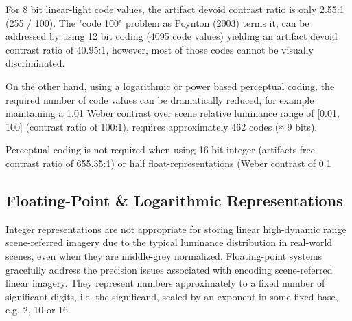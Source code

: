 For 8 bit linear-light code values, the artifact devoid contrast ratio is only 2.55:1 (255 / 100). The "code 100" problem as Poynton (2003) terms it, can be addressed by using 12 bit coding (4095 code values) yielding an artifact devoid contrast ratio of 40.95:1, however, most of those codes cannot be visually discriminated.

On the other hand, using a logarithmic or power based perceptual coding, the required number of code values can be dramatically reduced, for example maintaining a 1.01 Weber contrast over scene relative luminance range of [0.01, 100] (contrast ratio of 100:1), requires approximately 462 codes (≈ 9 bits).


Perceptual coding is not required when using 16 bit integer (artifacts free contrast ratio of 655.35:1) or half float-representations (Weber contrast of 0.1%

\subsection{Floating-Point & Logarithmic Representations}

Integer representations are not appropriate for storing linear high-dynamic range scene-referred imagery due to the typical luminance distribution in real-world scenes, even when they are middle-grey normalized. Floating-point systems gracefully address the precision issues associated with encoding scene-referred linear imagery. They represent numbers approximately to a fixed number of significant digits, i.e. the significand, scaled by an exponent in some fixed base, e.g. 2, 10 or 16.

